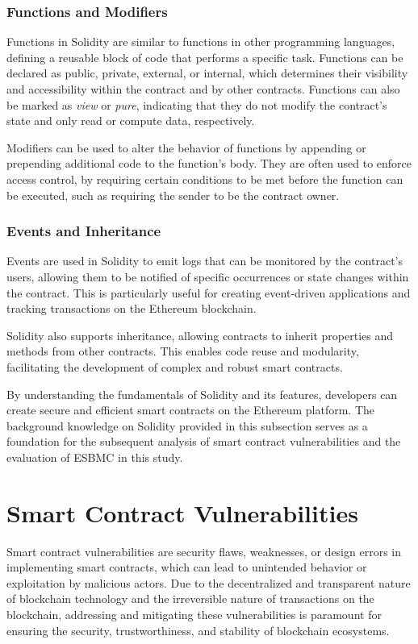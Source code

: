 \subsubsection{Functions and Modifiers}

Functions in Solidity are similar to functions in other programming languages, defining a reusable block of code that performs a specific task. Functions can be declared as public, private, external, or internal, which determines their visibility and accessibility within the contract and by other contracts. Functions can also be marked as \textit{view} or \textit{pure}, indicating that they do not modify the contract's state and only read or compute data, respectively.

Modifiers can be used to alter the behavior of functions by appending or prepending additional code to the function's body. They are often used to enforce access control, by requiring certain conditions to be met before the function can be executed, such as requiring the sender to be the contract owner.

\subsubsection{Events and Inheritance}

Events are used in Solidity to emit logs that can be monitored by the contract's users, allowing them to be notified of specific occurrences or state changes within the contract. This is particularly useful for creating event-driven applications and tracking transactions on the Ethereum blockchain.

Solidity also supports inheritance, allowing contracts to inherit properties and methods from other contracts. This enables code reuse and modularity, facilitating the development of complex and robust smart contracts.

By understanding the fundamentals of Solidity and its features, developers can create secure and efficient smart contracts on the Ethereum platform. The background knowledge on Solidity provided in this subsection serves as a foundation for the subsequent analysis of smart contract vulnerabilities and the evaluation of ESBMC in this study.

\section{Smart Contract Vulnerabilities}

Smart contract vulnerabilities are security flaws, weaknesses, or design errors in implementing smart contracts, which can lead to unintended behavior or exploitation by malicious actors. Due to the decentralized and transparent nature of blockchain technology and the irreversible nature of transactions on the blockchain, addressing and mitigating these vulnerabilities is paramount for ensuring the security, trustworthiness, and stability of blockchain ecosystems.

